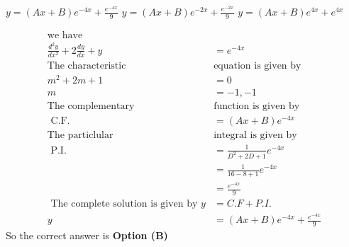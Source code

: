 \begin{enumerate}[label=\color{ocre}\textbf{\arabic*.}]
\begin{tasks}
	\task[\textbf{b.}]$y=(A x+B) e^{-4 x}+\frac{e^{-4 x}}{9}$
	\task[\textbf{c.}]$y=(A x+B) e^{-2 x}+\frac{e^{-2 x}}{9}$
	\task[\textbf{d.}]$y=(A x+B) e^{4 x}+e^{4 x}$ 
\end{tasks}
\begin{answer}
	$$
	\begin{aligned}
	\text{we have}&\\
	\frac{d^{2} y}{d x^{2}}+2 \frac{d y}{d x}+y&=e^{-4 x}\\
	\text{The characteristic }&\text{equation is given by}\\
	m^{2}+2 m+1&=0 \\ m&=-1,-1\\
	\text{The complementary }&\text{function is given by}\\
	\text { C.F. }&=(A x+B) e^{-4 x}\\
	\text{The particlular }&\text{integral is given by}\\
	\text { P.I. }&=\frac{1}{D^{2}+2 D+1} e^{-4 x}\\&=\frac{1}{16-8+1} e^{-4 x}\\&=\frac{e^{-4 x}}{9}\\
	\text{ The complete solution is given by }y&=C.F+P.I.\\
	y&=(A x+B) e^{-4 x}+\frac{e^{-4 x}}{9}
	\end{aligned}
	$$
	So the correct answer is \textbf{Option (B)}
\end{answer}


$\left. \right.$ \section*{}
$\left. \right.$ {}

\end{enumerate}